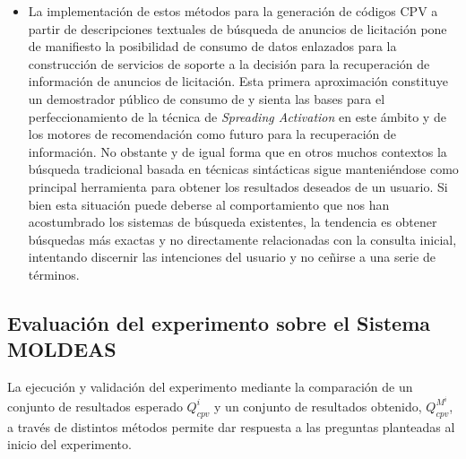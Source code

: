 \begin{itemize}
\item La implementación de estos métodos para la generación de códigos CPV a partir de descripciones textuales de búsqueda 
de anuncios de licitación pone de manifiesto la posibilidad de consumo de datos enlazados para la construcción de servicios 
de soporte a la decisión para la recuperación de información de anuncios de licitación. Esta primera aproximación constituye 
un demostrador público de consumo de \linkeddata y sienta las bases para el perfeccionamiento de la técnica de \textit{Spreading Activation} 
en este ámbito y de los motores de recomendación como futuro para la recuperación de información. No obstante y de igual 
forma que en otros muchos contextos la búsqueda tradicional basada en técnicas sintácticas sigue manteniéndose como 
principal herramienta para obtener los resultados deseados de un usuario. Si bien esta situación puede deberse 
al comportamiento que nos han acostumbrado los sistemas de búsqueda existentes, la tendencia es obtener búsquedas 
más exactas y no directamente relacionadas con la consulta inicial, intentando discernir las intenciones del usuario 
y no ceñirse a una serie de términos.
\end{itemize}


\subsection{Evaluación del experimento sobre el Sistema MOLDEAS}
La ejecución y validación del experimento mediante la comparación de un conjunto de resultados 
esperado $Q^{i}_{cpv}$ y un conjunto de resultados obtenido, $Q^{M^i}_{cpv}$, a través de distintos métodos 
permite dar respuesta a las preguntas planteadas al inicio del experimento.

